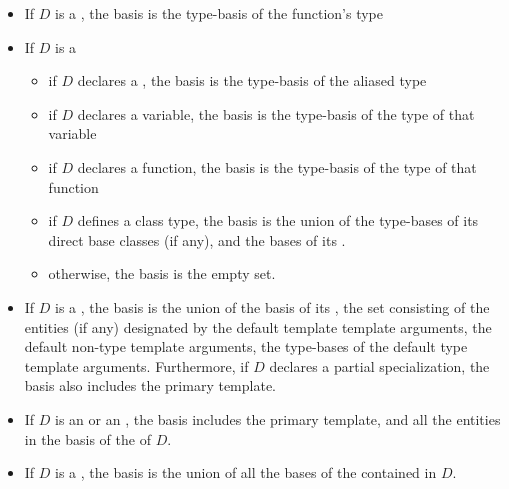 \begin{undecided}
\begin{std.txt}
\begin{itemize}
\begin{itemize}
        \item if $D$ declares a conversion function, the basis is
        the type-basis of the return type

        \item otherwise, the basis is empty.
    \end{itemize}

    \item If $D$ is a , the basis is
    the type-basis of the function's type

    \item If $D$ is a 
    \begin{itemize}
        \item if $D$ declares a , the basis is the
        type-basis of the aliased type
        \item if $D$ declares a variable, the basis is the type-basis
         of the type of that variable
         \item if $D$ declares a function, the basis is the type-basis of the type of that function
         \item if $D$ defines a class type, the basis is the union of the
         type-bases of its direct base classes (if any), and the bases of
         its .
         \item otherwise, the basis is the empty set.
    \end{itemize}

    \item If $D$ is a , the basis is the union
    of the basis of its , the set
    consisting of the entities (if any) designated by the default
    template template arguments, the default non-type template arguments, the
    type-bases of the default type template arguments.
    Furthermore, if $D$ declares a
    partial specialization, the basis also includes the primary template.

    \item If $D$ is  an 
    or an , the basis includes
    the primary template, and all the entities in the basis of the 
     of $D$.

    \item If $D$ is a , the basis is the union
    of all the bases of the  contained in $D$.


\end{itemize}
\end{std.txt}
\end{undecided}
